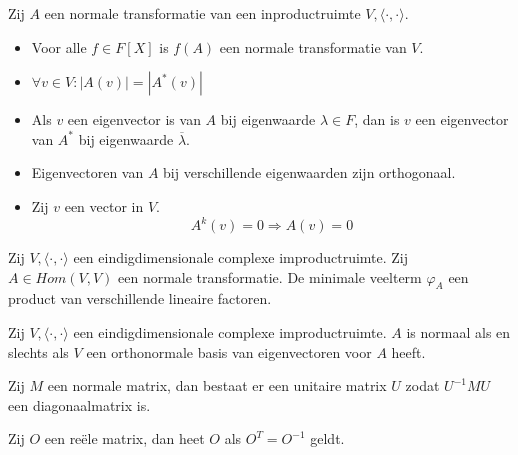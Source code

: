 \documentclass[main.tex]{subfiles}
\begin{document}
\begin{lem}
  Zij $A$ een normale transformatie van een inproductruimte $V,\langle\cdot,\cdot\rangle$.
  \begin{itemize}
  \item Voor alle $f\in F[X]$ is $f(A)$ een normale transformatie van $V$.
  \item $\forall v\in V: |A(v)| = |A^{*}(v)|$
  \item Als $v$ een eigenvector is van $A$ bij eigenwaarde $\lambda \in F$, dan is $v$ een eigenvector van $A^{*}$ bij eigenwaarde $\overline{\lambda}$. 
  \item Eigenvectoren van $A$ bij verschillende eigenwaarden zijn orthogonaal.
  \item Zij $v$ een vector in $V$.
    \[ A^{k}(v) = 0 \Rightarrow A(v) = 0 \]
  \end{itemize}
\end{lem}

\begin{lem}
  Zij $V,\langle\cdot,\cdot\rangle$ een eindigdimensionale complexe improductruimte.
  Zij $A\in Hom(V,V)$ een normale transformatie.
  De minimale veelterm $\varphi_{A}$ een product van verschillende lineaire factoren.
\end{lem}

\begin{st}
  \examen
  Zij $V,\langle\cdot,\cdot\rangle$ een eindigdimensionale complexe improductruimte.
  $A$ is normaal als en slechts als $V$ een orthonormale basis van eigenvectoren voor $A$ heeft.
\end{st}

\begin{gev}
  Zij $M$ een normale matrix, dan bestaat er een unitaire matrix $U$ zodat $U^{-1}MU$ een diagonaalmatrix is.
\end{gev}

\begin{de}
  Zij $O$ een re\"ele matrix, dan heet $O$  als $O^{T}= O^{-1}$ geldt.
\end{de}
\end{document}
